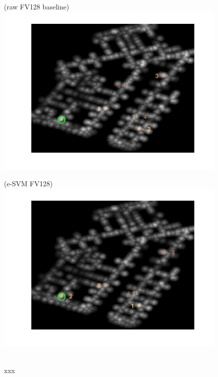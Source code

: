 \documentclass[10pt,onecolumn,A4]{article}
\begin{document}
\begin{figure}
	\begin{minipage}{0.45\linewidth}
		\center
		(raw FV128 baseline) \\
		\includegraphics[trim = 55mm 40mm 55mm 25mm, clip=true,width=\linewidth]{sup1962/heatRaw.jpg}
	\end{minipage} 
	\begin{minipage}{0.45\linewidth}
		\center
		(e-SVM FV128) \\
		\includegraphics[trim = 55mm 40mm 55mm 25mm, clip=true,width=\linewidth]{sup1962/heatSvm.jpg}
	\end{minipage} 
	\\
	\textcolor{myWhite}{xxx}\\

\end{figure}
\end{document}
